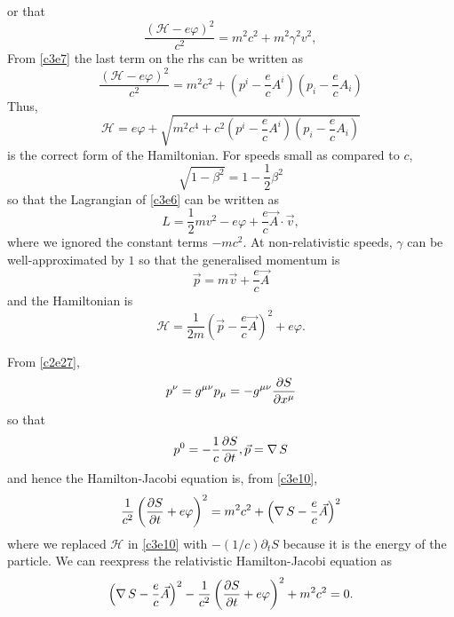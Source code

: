 \begin{enumerate}
\[\]
or that
\[
\frac{(\mathcal{H} - e\varphi)^2}{c^2} = m^2c^2 + m^2\gamma^2 v^2,
\]
From \eqref{c3e7} the last term on the rhs can be written as
\begin{equation}\label{c3e10}
\frac{(\mathcal{H} - e\varphi)^2}{c^2} = m^2c^2 + \left(p^i - \frac{e}{c}A^i\right)
\left(p_i - \frac{e}{c}A_i\right)
\end{equation}
Thus,
\begin{equation}\label{c3e11}
\mathcal{H} = e\varphi + \sqrt{m^2c^4 + c^2 
\left(p^i - \frac{e}{c}A^i\right)\left(p_i - \frac{e}{c}A_i\right)}
\end{equation}
is the correct form of the Hamiltonian. For speeds small as compared to $c$,
\[
\sqrt{1 - \beta^2} = 1 - \frac{1}{2}\beta^2
\]
so that the Lagrangian of \eqref{c3e6} can be written as
\begin{equation}\label{c3e12}
L = \frac{1}{2}mv^2 - e\varphi + \frac{e}{c}\vec{A}\cdot\vec{v},
\end{equation}
where we ignored the constant terms $-mc^2$. At non-relativistic speeds, $\gamma$
can be well-approximated by $1$ so that the generalised momentum is
\begin{equation}\label{c3e13}
\vec{p} = m\vec{v} + \frac{e}{c}\vec{A}
\end{equation}
and the Hamiltonian is
\begin{equation}\label{c3e14}
\mathcal{H} = \frac{1}{2m}\left(\vec{p} - \frac{e}{c}\vec{A}\right)^2 + e\varphi.
\end{equation}

From \eqref{c2e27},
\[
p^\nu = g^{\mu\nu}p_\mu = -g^{\mu\nu}\frac{\partial{S}}{\partial{x^\mu}}
\]
so that
\[
p^0 = -\frac{1}{c}\frac{\partial{S}}{\partial{t}}, \vec{p} = \operatorname{\nabla} S
\]
and hence the Hamilton-Jacobi equation is, from \eqref{c3e10},
\[
\frac{1}{c^2}\left(\frac{\partial{S}}{\partial{t}} + e\varphi\right)^2 = m^2c^2 + 
\left(\operatorname{\nabla} S - \frac{e}{c}\vec{A}\right)^2
\]
where we replaced $\mathcal{H}$ in \eqref{c3e10} with $-(1/c)\partial_t S$ because
it is the energy of the particle. We can reexpress the relativistic Hamilton-Jacobi
equation as 
\begin{equation}\label{c3e15}
\left(\operatorname{\nabla} S - \frac{e}{c}\vec{A}\right)^2 - 
\frac{1}{c^2}\left(\frac{\partial{S}}{\partial{t}} + e\varphi\right)^2 + m^2c^2 = 0.
\end{equation}


\end{enumerate}
